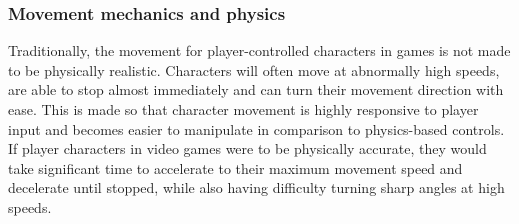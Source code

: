 

\subsubsection{Movement mechanics and physics}


Traditionally, the movement for player-controlled characters in games is not made to be physically realistic. Characters will often move at abnormally high speeds, are able to stop almost immediately and can turn their movement direction with ease. This is made so that character movement is highly responsive to player input and becomes easier to manipulate in comparison to physics-based controls. If player characters in video games were to be physically accurate, they would take significant time to accelerate to their maximum movement speed and decelerate until stopped, while also having difficulty turning sharp angles at high speeds.

